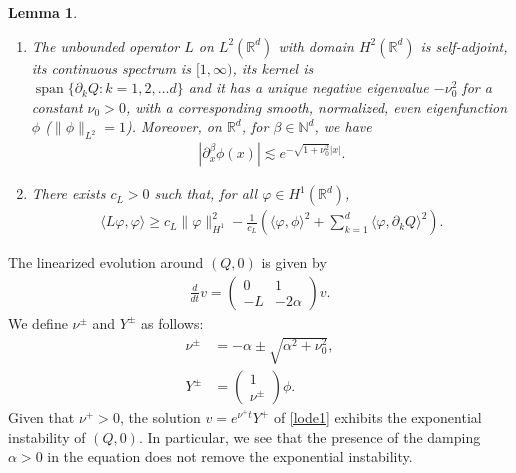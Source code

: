 \documentclass[reqno]{amsart}
\theoremstyle{plain}
\newtheorem{lemma}[theorem]{Lemma}
\theoremstyle{definition}
\numberwithin{equation}{section}
\newcommand{\1}{\mathbbm{1}}
\DeclareMathOperator{\Span}{span}
\begin{document}
\begin{lemma}\label{Lproperty}
\begin{enumerate}
\item The unbounded operator $L$ on $L^2(\mathbb{R}^d)$ with domain $H^2(\mathbb{R}^d)$ is self-adjoint, its continuous spectrum is $[1,\infty)$, its kernel is 
\\
$\Span{ \{ {\partial}_kQ : k=1,2,\ldots d \}}$ and it has a unique negative eigenvalue $-\nu_0^2$ for a constant $\nu_0>0$, with a corresponding smooth, normalized, even eigenfunction $\phi$ ($\|\phi\|_{L^2}=1$). Moreover, on $\mathbb{R}^d$, for $\beta\in \mathbb{N}^d$, we have
\begin{align*}
|{\partial}_x^{\beta} \phi(x)|\lesssim e^{-\sqrt{1+\nu_0^2}|x|}.
\end{align*}
\item There exists $c_L>0$ such that, for all $\varphi \in H^1(\mathbb{R}^d)$,
\begin{align*}
\langle L\varphi,\varphi\rangle\geq c_L\|\varphi\|_{H^1}^2-\frac{1}{c_L}\left(\langle \varphi,\phi\rangle^2+\sum_{k=1}^d\langle\varphi,{\partial}_kQ\rangle^2\right).
\end{align*}
\end{enumerate}
\end{lemma}
The linearized evolution around $(Q,0)$ is given by
\begin{align}\label{lode1}
\frac{d}{dt}v= 
\begin{pmatrix}
0 & 1
\\
-L& -2\alpha
\end{pmatrix}
v.
\end{align}
We define $\nu^{\pm}$ and $Y^{\pm}$ as follows:
\begin{align*}
\nu^{\pm}&=-\alpha \pm \sqrt{\alpha^2+\nu_0^2},
\\
Y^{\pm}&=
\begin{pmatrix}
1
\\
\nu^{\pm}
\end{pmatrix}
\phi.
\end{align*}
Given that $\nu^+>0$, the solution $v=e^{\nu^+t}Y^+$ of \eqref{lode1} exhibits the exponential instability of $(Q,0)$. In particular, we see that the presence of the damping $\alpha>0$ in the equation does not remove the exponential instability.
\end{document}
